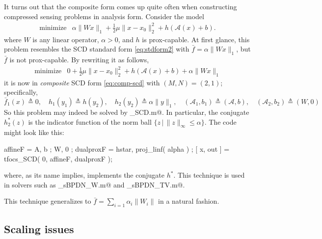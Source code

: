 \documentclass{article}
\newcommand{\cA}{\ensuremath{\mathcal{A}}}    %
\newcommand\thalf{{\textstyle\frac{1}{2}}}
\newcommand{\<}{\langle}
\renewcommand{\>}{\rangle}
\begin{document}
It turns out that the composite form comes up quite often when 
constructing compressed sensing problems in analysis form. Consider the model
\begin{equation}
	\label{eq:stdform4a} %
	\begin{array}{ll}
	\text{minimize} & \alpha\|Wx\|_1 + \thalf\mu\|x-x_0\|_2^2 + h(\cA(x)+b).
	\end{array}
\end{equation}
where $W$ is any linear operator, $\alpha > 0$, and $h$ is prox-capable.
At first glance, this problem
resembles the SCD standard form \eqref{eq:stdform2} with
$\bar{f} = \alpha\|Wx\|_1$, but $\bar{f}$ is not prox-capable. 
By rewriting it as follows,
\begin{equation}
	\label{eq:stdform4}
	\begin{array}{ll}
	\text{minimize} & 0 + \thalf\mu\|x-x_0\|_2^2 + h(\cA(x)+b) + \alpha\|Wx\|_1 
	\end{array}
\end{equation}
it is now in \emph{composite} SCD form \eqref{eq:comp-scd} with $(M,N)=(2,1)$; specifically,
\begin{equation}
	\bar{f}_1(x) \triangleq 0, \quad h_1(y_1)\triangleq h(y_2), \quad h_2(y_2) \triangleq \alpha\|y\|_1, \quad
	(\cA_1,b_1)\triangleq (\cA,b), \quad (\cA_2,b_2) \triangleq (W,0)
\end{equation}
So this problem may indeed be solved by \verb@tfocs_SCD.m@. In particular,
the conjugate $h^*_2(z)$ is the indicator function of the norm ball $\{z\,|\,\|z\|_\infty\leq\alpha\}$.
The code might look like this:
\begin{code}
	affineF = { A, b ; W, 0 };
	dualproxF = { hstar, proj_linf( alpha ) };
	[ x, out ] = tfocs_SCD( 0, affineF, dualproxF );
\end{code}
where, as its name implies, \verb@hstar@ implements the conjugate $h^*$.
This technique is used in solvers such as \verb@solver_sBPDN_W.m@
and \verb@solver_sBPDN_TV.m@.

This technique generalizes to $\bar{f} = \sum_{i=1} \alpha_i\|W_i\|$
in a natural fashion.

\subsection{Scaling issues}
\label{sec:scaling} %
\end{document}
